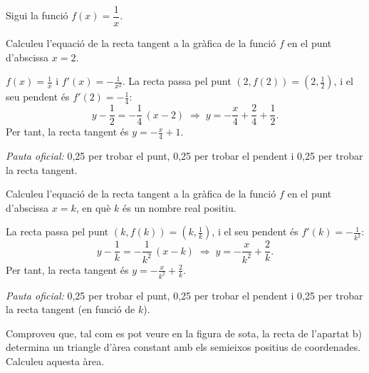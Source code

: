 Sigui la funció $f(x)=\dfrac1x$.

\begin{apartats}

Calculeu l'equació de la recta tangent a la gràfica de la funció $f$ en el punt d'abscissa $x=2$.

\begin{solucio}
$f(x)=\frac1x$ i $f'(x)=-\frac{1}{x^2}$. La recta passa pel punt $(2,f(2))=\left(2,\frac12\right)$, i el seu
pendent és $f'(2)=-\frac14$:
\[
y-\frac12=-\frac14\,(x-2)\;\Rightarrow\;y=-\frac x4+\frac24+\frac12 .
\]
Per tant, la recta tangent és $\boxed{y=-\frac x4+1}$.

\textit{Pauta oficial:} 0,25 per trobar el punt, 0,25 per trobar el pendent i 0,25 per trobar la recta tangent.
\end{solucio}

Calculeu l'equació de la recta tangent a la gràfica de la funció $f$ en el punt d'abscissa $x=k$, en què $k$ és un
nombre real positiu.

\begin{solucio}
La recta passa pel punt $(k,f(k))=\left(k,\frac1k\right)$, i el seu pendent és $f'(k)=-\frac{1}{k^2}$:
\[
y-\frac1k=-\frac{1}{k^2}\,(x-k)\;\Rightarrow\;y=-\frac{x}{k^2}+\frac2k .
\]
Per tant, la recta tangent és $\boxed{y=-\frac{x}{k^2}+\frac2k}$.

\textit{Pauta oficial:} 0,25 per trobar el punt, 0,25 per trobar el pendent i 0,25 per trobar la recta tangent
(en funció de $k$).
\end{solucio}

Comproveu que, tal com es pot veure en la figura de sota, la recta de l'apartat b) determina un triangle d'àrea
constant amb els semieixos positius de coordenades. Calculeu aquesta àrea.
\begin{center}
\end{center}


\end{apartats}
